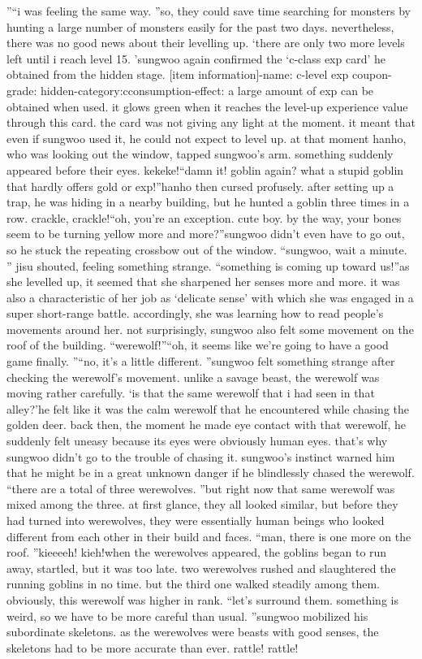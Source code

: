”“i was feeling the same way.
”so, they could save time searching for monsters by hunting a large number of monsters easily for the past two days.
nevertheless, there was no good news about their levelling up.
‘there are only two more levels left until i reach level 15.
’sungwoo again confirmed the ‘c-class exp card’ he obtained from the hidden stage.
[item information]-name: c-level exp coupon-grade: hidden-category:cconsumption-effect: a large amount of exp can be obtained when used.
 it glows green when it reaches the level-up experience value through this card.
the card was not giving any light at the moment.
 it meant that even if sungwoo used it, he could not expect to level up.
at that moment hanho, who was looking out the window, tapped sungwoo’s arm.
something suddenly appeared before their eyes.
kekeke!“damn it! goblin again? what a stupid goblin that hardly offers gold or exp!”hanho then cursed profusely.
 after setting up a trap, he was hiding in a nearby building, but he hunted a goblin three times in a row.
crackle, crackle!“oh, you’re an exception.
 cute boy.
 by the way, your bones seem to be turning yellow more and more?”sungwoo didn’t even have to go out, so he stuck the repeating crossbow out of the window.
“sungwoo, wait a minute.
” jisu shouted, feeling something strange.
“something is coming up toward us!”as she levelled up, it seemed that she sharpened her senses more and more.
 it was also a characteristic of her job as ‘delicate sense’ with which she was engaged in a super short-range battle.
 accordingly, she was learning how to read people’s movements around her.
not surprisingly, sungwoo also felt some movement on the roof of the building.
“werewolf!”“oh, it seems like we’re going to have a good game finally.
”“no, it’s a little different.
”sungwoo felt something strange after checking the werewolf’s movement.
 unlike a savage beast, the werewolf was moving rather carefully.
‘is that the same werewolf that i had seen in that alley?’he felt like it was the calm werewolf that he encountered while chasing the golden deer.
back then, the moment he made eye contact with that werewolf, he suddenly felt uneasy because its eyes were obviously human eyes.
that’s why sungwoo didn’t go to the trouble of chasing it.
 sungwoo’s instinct warned him that he might be in a great unknown danger if he blindlessly chased the werewolf.
“there are a total of three werewolves.
”but right now that same werewolf was mixed among the three.
 at first glance, they all looked similar, but before they had turned into werewolves, they were essentially human beings who looked different from each other in their build and faces.
“man, there is one more on the roof.
”kieeeeh! kieh!when the werewolves appeared, the goblins began to run away, startled, but it was too late.
two werewolves rushed and slaughtered the running goblins in no time.
but the third one walked steadily among them.
 obviously, this werewolf was higher in rank.
“let’s surround them.
 something is weird, so we have to be more careful than usual.
”sungwoo mobilized his subordinate skeletons.
 as the werewolves were beasts with good senses, the skeletons had to be more accurate than ever.
rattle! rattle!

